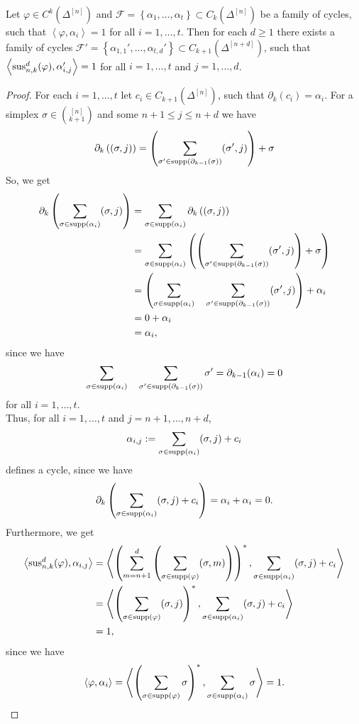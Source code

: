 \begin{lem}\label{lemma11}
Let \(\varphi\in C^k(\Delta^{[n]})\) and \(\mathcal{F}=\left\{\alpha_1,\ldots,\alpha_t\right\}\subset C_k(\Delta^{[n]})\) be a family of cycles, such that \(\left\langle\varphi,\alpha_i\right\rangle=1\) for all \(i=1,\ldots,t\). Then for each \(d\geq 1\) there exists a family of cycles \(\mathcal{F}'=\left\{\alpha_{1,1}',\ldots,\alpha_{t,d}'\right\}\subset C_{k+1}(\Delta^{[n+d]})\), such that \(\left\langle \mathrm{sus}_{n,k}^d(\varphi),\alpha_{i,j}'\right\rangle=1\) for all \(i=1,\ldots,t\) and \(j=1,\ldots,d\).
\begin{proof}
For each \(i=1,\ldots,t\) let \(c_i\in C_{k+1}(\Delta^{[n]})\), such that \(\partial_k(c_i)=\alpha_i\). For a simplex \(\sigma\in\binom{[n]}{k+1}\) and some \(n+1\leq j\leq n+d\) we have
\[
\partial_k\left((\sigma,j)\right)=\left(\sum\limits_{\sigma'\in \mathrm{supp}(\partial_{k-1}(\sigma))}(\sigma',j)\right)+\sigma
\]
So, we get
\begin{align*}
\partial_k\left(\sum\limits_{\sigma\in \mathrm{supp}(\alpha_i)}(\sigma,j)\right)&=\sum\limits_{\sigma\in \mathrm{supp}(\alpha_i)}\partial_k\left((\sigma,j)\right)\\
&=\sum\limits_{\sigma\in \mathrm{supp}(\alpha_i)}\left(\left(\sum\limits_{\sigma'\in \mathrm{supp}(\partial_{k-1}(\sigma))}(\sigma',j)\right)+\sigma\right)\\
&=\left(\sum\limits_{\sigma\in \mathrm{supp}(\alpha_i)}\quad\sum\limits_{\sigma'\in \mathrm{supp}(\partial_{k-1}(\sigma))}(\sigma',j)\right)+\alpha_i\\
&=0+\alpha_i\\
&=\alpha_i,
\end{align*}
since we have
\[
\sum\limits_{\sigma\in \mathrm{supp}(\alpha_i)}\quad\sum\limits_{\sigma'\in \mathrm{supp}(\partial_{k-1}(\sigma))}\sigma'=\partial_{k-1}(\alpha_i)=0
\]
for all \(i=1,\ldots,t\).\\
Thus, for all \(i=1,\ldots,t\) and \(j=n+1,\ldots,n+d\),
\[
\alpha_{i,j}:=\sum\limits_{\sigma\in \mathrm{supp}(\alpha_i)}(\sigma,j)+c_i
\]
defines a cycle, since we have
\[
\partial_k\left(\sum\limits_{\sigma\in \mathrm{supp}(\alpha_i)}(\sigma,j)+c_i\right)=\alpha_i+\alpha_i=0.
\]
Furthermore, we get
\begin{align}
\left\langle \mathrm{sus}_{n,k}^d(\varphi),\alpha_{i,j}\right\rangle&=\left\langle\left(\sum\limits_{m=n+1}^d\left(\sum\limits_{\sigma\in \mathrm{supp}(\varphi)}(\sigma,m)\right)\right)^*,\sum\limits_{\sigma\in \mathrm{supp}(\alpha_i)}(\sigma,j)+c_i\right\rangle\notag\\
&=\left\langle\left(\sum\limits_{\sigma\in \mathrm{supp}(\varphi)}(\sigma,j)\right)^*,\sum\limits_{\sigma\in \mathrm{supp}(\alpha_i)}(\sigma,j)+c_i\right\rangle\notag\\
&=1,\notag
\end{align}
since we have
\[\left\langle\varphi,\alpha_i\right\rangle=\left\langle\left(\sum\limits_{\sigma\in \mathrm{supp}(\varphi)}\sigma\right)^*,\sum\limits_{\sigma\in \mathrm{supp}(\alpha_i)}\sigma\right\rangle=1.
\]
\end{proof}
\end{lem}

